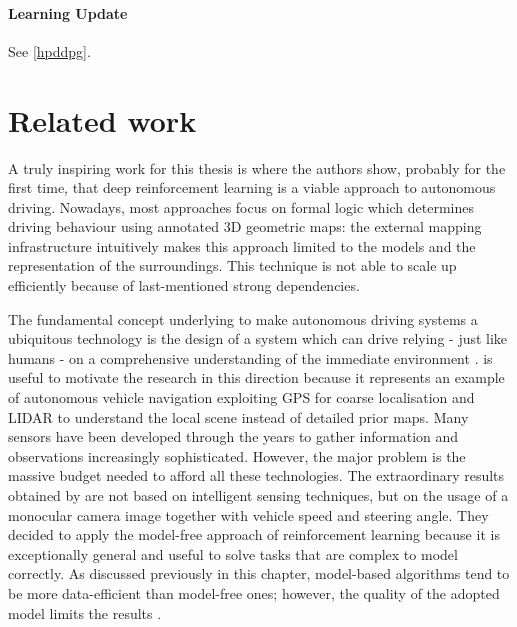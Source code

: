 \paragraph{Learning Update} See \vref{hpddpg}.


\section{Related work} \label{sec:related-work}


A truly inspiring work for this thesis is \cite{kendall2019learning} where the authors show, probably for the first time, that deep reinforcement learning is a viable approach to autonomous driving.
Nowadays,  most approaches focus on formal logic which determines driving behaviour using annotated 3D geometric maps: the external mapping infrastructure intuitively makes this approach limited to the models and the representation of the surroundings.
This technique is not able to scale up efficiently because of last-mentioned strong dependencies.

The fundamental concept underlying \cite{kendall2019learning} to make autonomous driving systems a ubiquitous technology is the design of a system which can drive relying - just like humans - on a comprehensive understanding of the immediate environment \cite{badrinarayanan2017segnet}.
\cite{ort2018autonomous} is useful to motivate the research in this direction because it represents an example of autonomous vehicle navigation exploiting GPS for coarse localisation and LIDAR to understand the local scene instead of detailed prior maps.
Many sensors have been developed through the years to gather information and observations increasingly sophisticated.
However, the major problem is the massive budget needed to afford all these technologies.
The extraordinary results obtained by \cite{kendall2019learning} are not based on intelligent sensing techniques, but on the usage of a monocular camera image together with vehicle speed and steering angle.
They decided to apply the model-free approach of reinforcement learning because it is exceptionally general and useful to solve tasks that are complex to model correctly.
As discussed previously in this chapter, model-based algorithms tend to be more data-efficient than model-free ones; however, the quality of the adopted model limits the results \cite{deisenroth2011pilco}.

